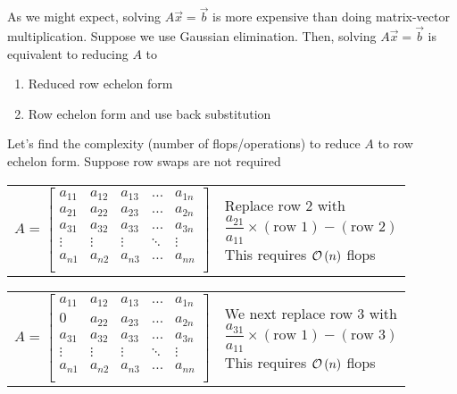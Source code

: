 As we might expect, 
solving $A\Vec{x} = \Vec{b}$ is more expensive than doing matrix-vector multiplication. 
Suppose we use Gaussian elimination. 
Then, solving $A\Vec{x}=\Vec{b}$ is equivalent to reducing $A$ to 
%
\begin{enumerate}
    \item Reduced row echelon form
    \item Row echelon form and use back substitution
\end{enumerate}
%
Let's find the complexity (number of flops/operations) 
to reduce $A$ to row echelon form. 
Suppose row swaps are not required
%
\begin{center}
    \begin{tabular}{p{6cm}p{6cm}}
\begin{equation*}
    A = 
    \begin{bmatrix}  
        a_{11} & a_{12} & a_{13} & \ldots & a_{1n} \\
        a_{21} & a_{22} & a_{23} & \ldots & a_{2n} \\
        a_{31} & a_{32} & a_{33} & \ldots & a_{3n} \\
        \vdots & \vdots & \vdots & \ddots & \vdots \\
        a_{n1} & a_{n2} & a_{n3} & \ldots & a_{nn} \\
    \end{bmatrix}  
\end{equation*} 
               & 
        \vspace{1em}
Replace row 2 with
\begin{equation*}
    \frac{a_{21}}{a_{11}} \times (\text{row 1}) - (\text{row 2})
\end{equation*}
        This requires $\mathcal{O}\left(n\right)$ flops             \\
    \end{tabular}
\end{center}
\begin{center}
    \begin{tabular}{p{6cm}p{6cm}}
\begin{equation*}
    A = 
    \begin{bmatrix}  
        a_{11} & a_{12} & a_{13} & \ldots & a_{1n} \\
        0      & a_{22} & a_{23} & \ldots & a_{2n} \\
        a_{31} & a_{32} & a_{33} & \ldots & a_{3n} \\
        \vdots & \vdots & \vdots & \ddots & \vdots \\
        a_{n1} & a_{n2} & a_{n3} & \ldots & a_{nn} \\
    \end{bmatrix}  
\end{equation*}
               & 
        \vspace{1em}
We next replace row 3 with
\begin{equation*}
    \frac{a_{31}}{a_{11}} \times (\text{row 1}) - (\text{row 3})
\end{equation*}
This requires $\mathcal{O}\left(n\right)$ flops                     \\
    \end{tabular}
\end{center}
